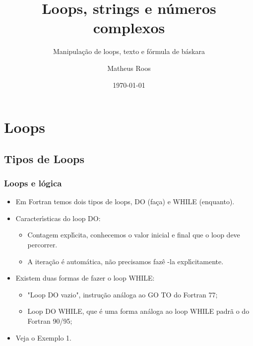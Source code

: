 \documentclass[xcolor=table]{beamer}
\newenvironment{stepitemize}{\begin{itemize}[<+->]}{\end{itemize} }
\begin{document}
\title[Loops, strings, complex]{Loops, strings e números complexos}
\subtitle{Manipulação de loops, texto e fórmula de báskara}
\author[Roos]{Matheus Roos}
\date{\today}
\maketitle

\begin{frame}
\tableofcontents
\end{frame}
\section{Loops}

\subsection{Tipos de Loops}

\begin{frame}%

\frametitle{Loops e l\'{o}gica}

\begin{stepitemize}
\item Em Fortran temos dois tipos de loops, DO (fa\c{c}a) e WHILE (enquanto).

\item Caracter\'{\i}sticas do loop DO:

\begin{itemize}
\item Contagem expl\'{\i}cita, conhecemos o valor inicial e final que o loop
deve percorrer.

\item A itera\c{c}\~{a}o \'{e} autom\'{a}tica, n\~{a}o precisamos faz\^{e}%
-la expl\'{\i}citamente.
\end{itemize}

\item Existem duas formas de fazer o loop WHILE:

\begin{itemize}
\item "Loop DO vazio", instru\c{c}\~{a}o an\'{a}loga ao GO TO do Fortran 77;

\item Loop DO WHILE, que \'{e} uma forma an\'{a}loga ao loop WHILE padr\~{a}%
o do Fortran 90/95;
\end{itemize}

\item Veja o Exemplo 1.
\end{stepitemize}

\transboxout%
\end{frame}%
\end{document}
